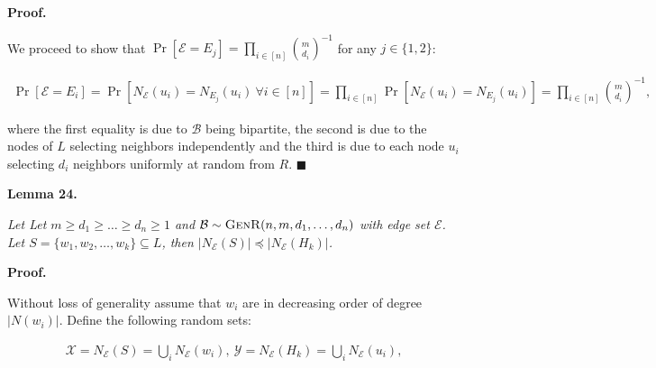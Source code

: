 


\par\medskip\noindent\textbf{Proof.}\par



We proceed to show that $\Pr[\mathcal{E}=E_{j}]=\prod_{i\in[n]}\binom{m}{d_{i}}^{-1}$ for any $j\in\{1,2\}$:\par


\[\begin{gathered}
\displaystyle\Pr[\mathcal{E}=E_{i}]=\Pr[N_{\mathcal{E}}(u_{i})=N_{E_{j}}(u_{i})\ \forall i\in[n]]=\prod_{i\in[n]}{\Pr[N_{\mathcal{E}}(u_{i})=N_{E_{j}}(u_{i})]}=\prod_{i\in[n]}{\binom{m}{d_{i}}^{-1}},
\end{gathered}\]


where the first equality is due to $\mathcal{B}$ being bipartite, the second is due to the nodes of $L$ selecting neighbors independently and the third is due to each node $u_{i}$ selecting $d_{i}$ neighbors uniformly at random from $R$.
\ensuremath{\blacksquare}\par






\par\medskip\noindent\textbf{\textbf{Lemma 24}\textbf{.}}\par



\emph{Let Let $m\geq d_{1}\geq\dots\geq d_{n}\geq 1$ and $\mathcal{B}\sim\textsc{GenR}(n,m,d_{1},\dots,d_{n})$ with edge set $\mathcal{E}$.
Let $S=\{w_{1},w_{2},\dots,w_{k}\}\subseteq L$, then $|N_{\mathcal{E}}(S)|\preccurlyeq|N_{\mathcal{E}}(H_{k})|$.}\par






\par\medskip\noindent\textbf{Proof.}\par



Without loss of generality assume that $w_{i}$ are in decreasing order of degree $|N(w_{i})|$.
Define the following random sets:\par


\[\begin{gathered}
\displaystyle\mathcal{X}=N_{\mathcal{E}}(S)=\bigcup_{i}N_{\mathcal{E}}(w_{i}),\ \mathcal{Y}=N_{\mathcal{E}}(H_{k})=\bigcup_{i}N_{\mathcal{E}}(u_{i}),
\end{gathered}\]


